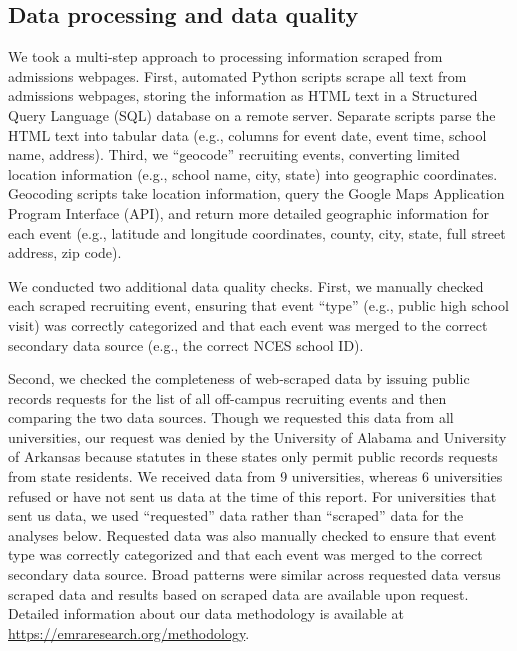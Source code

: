 \documentclass[twoside]{article}
\begin{document}

\subsection*{Data processing and data quality}

We took a multi-step approach to processing information scraped from admissions webpages. First, automated Python scripts scrape all text from admissions webpages, storing the information as HTML text in a Structured Query Language (SQL) database on a remote server. Separate scripts parse the HTML text into tabular data (e.g., columns for event date, event time, school name, address). Third, we ``geocode'' recruiting events, converting limited location information (e.g., school name, city, state) into geographic coordinates. Geocoding scripts take location information, query the Google Maps Application Program Interface (API), and return more detailed geographic information for each event (e.g., latitude and longitude coordinates, county, city, state, full street address, zip code).

We conducted two additional data quality checks. First, we manually checked each scraped recruiting event, ensuring that event ``type'' (e.g., public high school visit) was correctly categorized and that each event was merged to the correct secondary data source (e.g., the correct NCES school ID).

Second, we checked the completeness of web-scraped data by issuing public records requests for the list of all off-campus recruiting events and then comparing the two data sources. Though we requested this data from all universities, our request was denied by the University of Alabama and University of Arkansas because statutes in these states only permit public records requests from state residents. We received data from 9 universities, whereas 6 universities refused or have not sent us data at the time of this report. For universities that sent us data, we used ``requested'' data rather than ``scraped'' data for the analyses below. Requested data was also manually checked to ensure that event type was correctly categorized and that each event was merged to the correct secondary data source. Broad patterns were similar across requested data versus scraped data and results based on scraped data are available upon request. Detailed information about our data methodology is available at \href{https://emraresearch.org/methodology}{https://emraresearch.org/methodology}.
\end{document}
